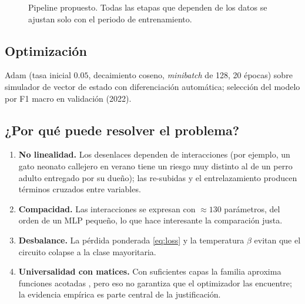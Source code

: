 \documentclass[11pt,letterpaper]{article}
\begin{document}
\begin{figure}[H]
\centering
{}
\caption{Pipeline propuesto. Todas las etapas que dependen de los datos se ajustan solo con el
periodo de entrenamiento.}
\end{figure}

\subsection{Optimización}
Adam (tasa inicial $0.05$, decaimiento coseno, \emph{minibatch} de 128, 20 épocas) sobre simulador de
vector de estado con diferenciación automática; selección del modelo por F1 macro en validación (2022).

\subsection{¿Por qué puede resolver el problema?}
\begin{enumerate}[leftmargin=*]
\item \textbf{No linealidad.} Los desenlaces dependen de interacciones (por ejemplo, un gato neonato
callejero en verano tiene un riesgo muy distinto al de un perro adulto entregado por su dueño); las
re-subidas y el entrelazamiento producen términos cruzados entre variables.
\item \textbf{Compacidad.} Las interacciones se expresan con $\approx130$ parámetros, del orden de un
MLP pequeño, lo que hace interesante la comparación justa.
\item \textbf{Desbalance.} La pérdida ponderada \eqref{eq:loss} y la temperatura $\beta$ evitan que el
circuito colapse a la clase mayoritaria.
\item \textbf{Universalidad con matices.} Con suficientes capas la familia aproxima funciones acotadas
\cite{perez2020}, pero eso no garantiza que el optimizador las encuentre; la evidencia empírica es
parte central de la justificación.
\end{enumerate}
\end{document}
